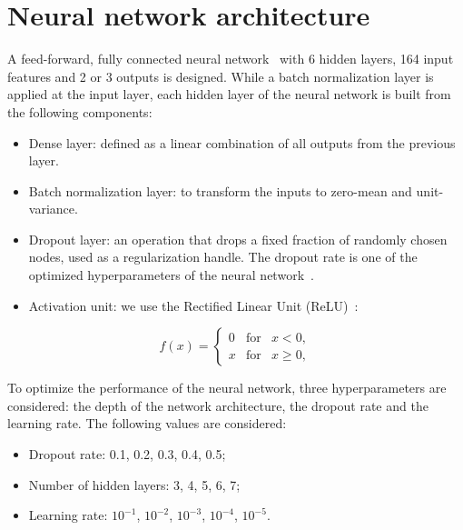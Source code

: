\section{Neural network architecture}
\label{sec:dnn}

\par A feed-forward, fully connected neural network~\cite{hopfield1982neural} with 6 hidden layers, 164 input features and 2 or 3 outputs is designed. While a batch normalization layer is applied at the input layer, each hidden layer of the neural network is built from the following components:

\begin{itemize}
    \item Dense layer: defined as a linear combination of all outputs from the previous layer.
    \item Batch normalization layer: to transform the inputs to zero-mean and unit-variance. ~\cite{DBLP:journals/corr/IoffeS15}
    \item Dropout layer: an operation that drops a fixed fraction of randomly chosen nodes, used as a regularization handle. The dropout rate is one of the optimized hyperparameters of the neural network~\cite{JMLR:v15:srivastava14a}.
    \item Activation unit: we use the Rectified Linear Unit (ReLU)~\cite{Pich:1998xt}:	
\end{itemize}

\begin{equation}
    f(x) = \left \{ \begin{array}{rcl}0 & \mbox{for} & x < 0,\\ x & \mbox{for} & x \ge 0,\end{array} \right. \label{eq:relu}
\end{equation}

\par To optimize the performance of the neural network, three hyperparameters are considered: the depth of the network architecture, the dropout rate and the learning rate. The following values are considered:

\begin{itemize}
    \item Dropout rate: 0.1, 0.2, 0.3, 0.4, 0.5;
    \item Number of hidden layers: 3, 4, 5, 6, 7;
    \item Learning rate: $10^{−1}$, $10^{−2}$, $10^{−3}$, $10^{−4}$, $10^{−5}$.
\end{itemize}


